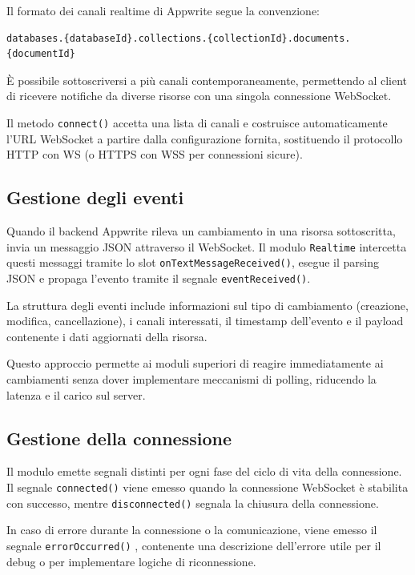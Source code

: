 \documentclass[a4paper, 11pt, twoside]{report}
\begin{document}
Il formato dei canali realtime di Appwrite segue la convenzione:
\begin{verbatim}
databases.{databaseId}.collections.{collectionId}.documents.{documentId}
\end{verbatim}

È possibile sottoscriversi a più canali contemporaneamente, permettendo al client di ricevere notifiche da diverse
risorse con una singola connessione \gls{WebSocket}.

Il metodo \texttt{connect()} accetta una lista di canali e costruisce automaticamente l'URL \gls{WebSocket} a partire dalla
configurazione fornita, sostituendo il protocollo \gls{HTTP} con WS (o \gls{HTTPS} con WSS per connessioni sicure).

\subsection{Gestione degli eventi}

Quando il backend Appwrite rileva un cambiamento in una risorsa sottoscritta, invia un messaggio JSON attraverso il
\gls{WebSocket}. Il modulo \texttt{Realtime} intercetta questi messaggi tramite lo slot \texttt{onTextMessageReceived()},
esegue il parsing JSON e propaga l'evento tramite il segnale \texttt{eventReceived()}.

La struttura degli eventi include informazioni sul tipo di cambiamento (creazione, modifica, cancellazione), i canali
interessati, il timestamp dell'evento e il payload contenente i dati aggiornati della risorsa.

Questo approccio permette ai moduli superiori di reagire immediatamente ai cambiamenti senza dover implementare
meccanismi di polling, riducendo la latenza e il carico sul server.

\subsection{Gestione della connessione}

Il modulo emette segnali distinti per ogni fase del ciclo di vita della connessione. Il segnale \texttt{connected()}
viene emesso quando la connessione \gls{WebSocket} è stabilita con successo, mentre \texttt{disconnected()} segnala la
chiusura della connessione.

In caso di errore durante la connessione o la comunicazione, viene emesso il segnale \texttt{errorOccurred()}
, contenente una descrizione dell'errore utile per il debug o per implementare logiche di riconnessione.
\end{document}
